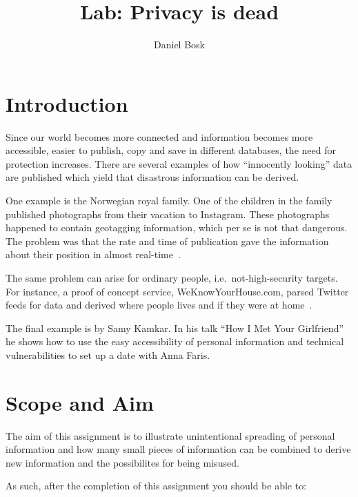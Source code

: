 \title{Lab: Privacy is dead}
\author{Daniel Bosk}

\maketitle
\begin{abstract}
  
\end{abstract}


\section{Introduction}%
\label{sec:introduction}
Since our world becomes more connected and information becomes more accessible, 
easier to publish, copy and save in different databases, the need for 
protection increases.
There are several examples of how ``innocently looking'' data are published 
which yield that disastrous information can be derived.

One example is the Norwegian royal family.
One of the children in the family published photographs from their vacation to 
Instagram.
These photographs happened to contain geotagging information, which per se is 
not that dangerous.
The problem was that the rate and time of publication gave the information 
about their position in almost real-time~\cite{Roberts2012wia}.

The same problem can arise for ordinary people, i.e.\ not-high-security 
targets.
For instance, a proof of concept service, WeKnowYourHouse.com, parsed Twitter 
feeds for data and derived where people lives and if they were at 
home~\cite{Brading2012tpl}.

The final example is by Samy Kamkar.
In his talk ``How I Met Your Girlfriend''~\cite{Kamkar2010him} he shows how to 
use the easy accessibility of personal information and technical 
vulnerabilities to set up a date with Anna Faris.


\section{Scope and Aim}%
\label{sec:aim}
The aim of this assignment is to illustrate unintentional spreading of personal 
information and how many small pieces of information can be combined to derive 
new information and the possibilites for being misused.

As such, after the completion of this assignment you should be able to:
\begin{itemize}
	
\end{itemize}


